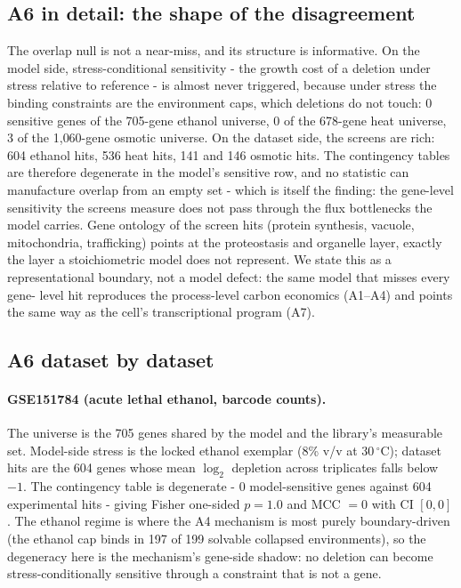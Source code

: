 \documentclass[12pt]{article}
\begin{document}
\subsection{A6 in detail: the shape of the disagreement}

The overlap null is not a near-miss, and its structure is
informative. On the model side, stress-conditional sensitivity -
the growth cost of a deletion under stress relative to reference -
is almost never triggered, because under stress the binding
constraints are the environment caps, which deletions do not touch:
0 sensitive genes of the 705-gene ethanol universe, 0 of the 678-gene
heat universe, 3 of the 1{,}060-gene osmotic universe. On the dataset
side, the screens are rich: 604 ethanol hits, 536 heat hits, 141 and
146 osmotic hits. The contingency tables are therefore degenerate in
the model's sensitive row, and no statistic can manufacture overlap
from an empty set - which is itself the finding: the gene-level
sensitivity the screens measure does not pass through the flux
bottlenecks the model carries. Gene ontology of the screen hits
(protein synthesis, vacuole, mitochondria, trafficking) points at the
proteostasis and organelle layer, exactly the layer a stoichiometric
model does not represent. We state this as a representational
boundary, not a model defect: the same model that misses every gene-
level hit reproduces the process-level carbon economics (A1--A4) and
points the same way as the cell's transcriptional program (A7).


\subsection{A6 dataset by dataset}
\label{sec:a6detail}

\paragraph{GSE151784 (acute lethal ethanol, barcode counts).} The
universe is the 705 genes shared by the model and the library's
measurable set. Model-side stress is the locked ethanol exemplar
(8\% v/v at 30\,$^{\circ}$C); dataset hits are the 604 genes whose
mean $\log_2$ depletion across triplicates falls below $-1$. The
contingency table is degenerate - 0 model-sensitive genes against 604
experimental hits - giving Fisher one-sided $p=1.0$ and MCC $=0$
with CI $[0,0]$. The ethanol regime is where the A4 mechanism is
most purely boundary-driven (the ethanol cap binds in 197 of 199
solvable collapsed environments), so the degeneracy here is the
mechanism's gene-side shadow: no deletion can become
stress-conditionally sensitive through a constraint that is not a
gene.
\end{document}
